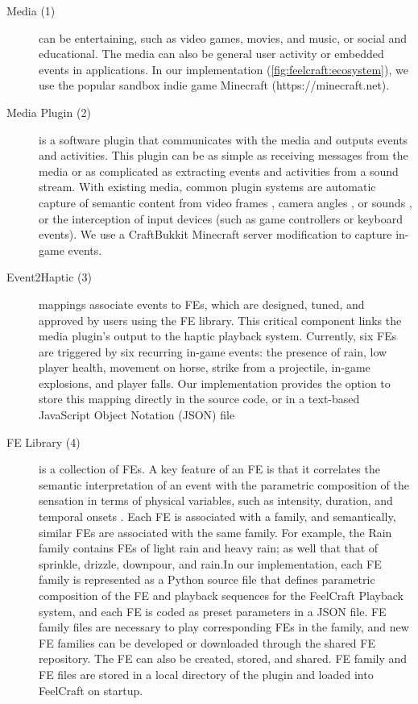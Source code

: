 \begin{description}
	\item[Media (1)] can be entertaining, such as video games, movies, and music, or
social and educational.
The media can also be general user activity or embedded events in applications. In our implementation (\autoref{fig:feelcraft:ecosystem}), we use the popular sandbox indie game Minecraft (https://minecraft.net).

	\item[Media Plugin (2)] is a software plugin that communicates with the media and
outputs events and activities. This plugin can be as simple as receiving messages from the media or as complicated as extracting events and activities from a sound stream. With existing media, common plugin systems are automatic capture of semantic content from video frames \cite{Isokoski2012}, camera angles \cite{Danieau2014}, or sounds \cite{Lee2013,Chang2005}, or the interception of input devices (such as game controllers or keyboard events). We use a CraftBukkit Minecraft server modification to capture in-game events.

	\item[Event2Haptic (3)] mappings associate events to FEs, which are designed, tuned,
and approved by users using the FE library. This critical component links the media plugin's output to the haptic playback system. Currently, six FEs are triggered by six recurring in-game events: the presence of rain, low player health, movement on horse, strike from a projectile, in-game explosions, and player falls. Our implementation provides the option to store this mapping directly in the source code, or in a text-based JavaScript Object Notation (JSON) file

	\item[FE Library (4)] is a collection of FEs. A key feature of an FE is that it correlates
the semantic interpretation of an event with the parametric composition of the sensation in terms of physical variables, such as intensity, duration, and temporal onsets \cite{Israr2014}. Each FE is associated with a family, and semantically, similar FEs are associated with the same family. For example, the Rain family contains FEs of light rain and heavy rain; as well that that of sprinkle, drizzle, downpour, and rain.In our implementation, each FE family is represented as a Python source file that defines parametric composition of the FE and playback sequences for the FeelCraft Playback system, and each FE is coded as preset parameters in a JSON file. FE family files are necessary to play corresponding FEs in the family, and new FE families can be developed or downloaded through the shared FE repository. The FE can also be created, stored, and shared. FE family and FE files are stored in a local directory of the plugin and loaded into FeelCraft on startup.


\end{description}
